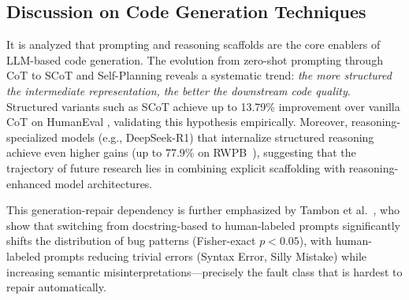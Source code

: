 \documentclass[10pt,a4paper]{article}
\begin{document}
\subsection{Discussion on Code Generation Techniques}
It is analyzed that prompting and reasoning scaffolds are the core enablers of LLM-based code generation. The evolution from zero-shot prompting through CoT to SCoT and Self-Planning reveals a systematic trend: \textit{the more structured the intermediate representation, the better the downstream code quality}. Structured variants such as SCoT achieve up to 13.79\% improvement over vanilla CoT on HumanEval \cite{li2025scot}, validating this hypothesis empirically. Moreover, reasoning-specialized models (e.g., DeepSeek-R1) that internalize structured reasoning achieve even higher gains (up to 77.9\% on RWPB~\cite{dou2026}), suggesting that the trajectory of future research lies in combining explicit scaffolding with reasoning-enhanced model architectures.

This generation-repair dependency is further emphasized by Tambon et al.~\cite{tambon2025}, who show that switching from docstring-based to human-labeled prompts significantly shifts the distribution of bug patterns (Fisher-exact $p<0.05$), with human-labeled prompts reducing trivial errors (Syntax Error, Silly Mistake) while increasing semantic misinterpretations---precisely the fault class that is hardest to repair automatically.
\end{document}
